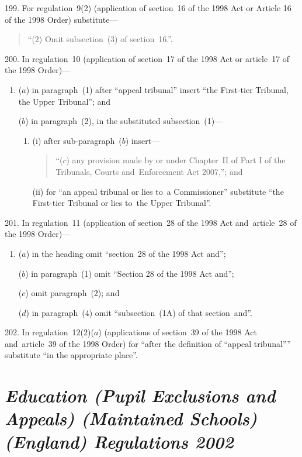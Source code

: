 \documentclass[12pt,a4paper]{article}
\begin{document}
\medskip

199.  For regulation~9(2) (application of section~16 of the 1998 Act or Article 16 of the 1998 Order) substitute—
\begin{quotation}
“(2) Omit subsection~(3) of section~16.”.
\end{quotation}

\medskip

200.  In regulation~10 (application of section~17 of the 1998 Act or article~17 of the 1998 Order)—
\begin{enumerate}\item[]
($a$) in paragraph~(1) after “appeal tribunal” insert “the First-tier Tribunal, the Upper Tribunal”; and

($b$) in paragraph~(2), in the substituted subsection~(1)—
\begin{enumerate}\item[]
(i) after sub-paragraph~($b$)  insert—
\begin{quotation}
“($c$) any provision made by or under Chapter~II of Part I of the Tribunals, Courts and~Enforcement Act 2007,”; and
\end{quotation}

(ii) for “an appeal tribunal or lies to~a Commissioner” substitute “the First-tier Tribunal or lies to~the Upper Tribunal”.
\end{enumerate}
\end{enumerate}

\medskip

201.  In regulation~11 (application of section~28 of the 1998 Act and~article~28 of the 1998 Order)—
\begin{enumerate}\item[]
($a$) in the heading omit “section~28 of the 1998 Act and”;

($b$) in paragraph~(1) omit “Section 28 of the 1998 Act and”;

($c$) omit paragraph~(2); and

($d$) in paragraph~(4) omit “subsection~(1A) of that section~and”.
\end{enumerate}

\medskip

202.  In regulation~12(2)($a$)  (applications of section~39 of the 1998 Act and~article~39 of the 1998 Order) for “after the definition of “appeal tribunal”” substitute “in the appropriate place”.

\section*{\itshape\sloppy Education (Pupil Exclusions and Appeals) (Maintained Schools) (England) Regulations 2002}
\end{document}
